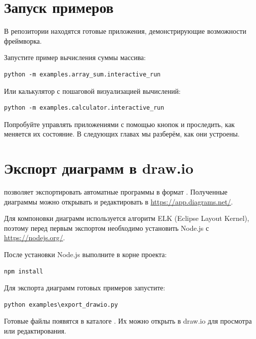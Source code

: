 \section{Запуск примеров}

В репозитории находятся готовые приложения,
демонстрирующие возможности фреймворка.

Запустите пример вычисления суммы массива:

\begin{lstlisting}[language={},numbers=none]
python -m examples.array_sum.interactive_run
\end{lstlisting}

Или калькулятор с пошаговой визуализацией вычислений:

\begin{lstlisting}[language={},numbers=none]
python -m examples.calculator.interactive_run
\end{lstlisting}

Попробуйте управлять приложениями с помощью кнопок
и проследить, как меняется их состояние.
В следующих главах мы разберём, как они устроены.

\section{Экспорт диаграмм в draw.io}

\CIAO{} позволяет экспортировать автоматные программы
в формат . Полученные диаграммы можно
открывать и редактировать в \url{https://app.diagrams.net/}.

Для компоновки диаграмм используется алгоритм ELK
(Eclipse Layout Kernel), поэтому перед первым экспортом
необходимо установить Node.js с \url{https://nodejs.org/}.

После установки Node.js выполните в корне проекта:

\begin{lstlisting}[language={},numbers=none]
npm install
\end{lstlisting}

Для экспорта диаграмм готовых примеров запустите:

\begin{lstlisting}[language={},numbers=none]
python examples\export_drawio.py
\end{lstlisting}

Готовые файлы появятся в каталоге
.
Их можно открыть в draw.io для просмотра или редактирования.
